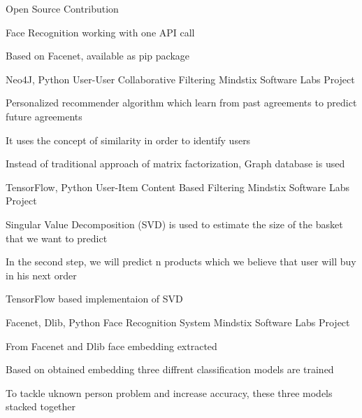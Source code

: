 \begin{cventries}
    {Open Source Contribution} %
    {} %
    {
      \begin{cvitems} %
        \item {Face Recognition working with one API call}
        \item {Based on Facenet, available as pip package}
      \end{cvitems}
    }
  \cventry
    {Neo4J, Python} %
    {User-User Collaborative Filtering} %
    {Mindstix Software Labs Project} %
    {} %
    {
      \begin{cvitems} %
        \item {Personalized recommender algorithm which learn from past agreements to predict future agreements}
        \item {It uses the concept of similarity in order to identify users}
        \item {Instead of traditional approach of matrix factorization, Graph database is used}
      \end{cvitems}
    }
  \cventry
    {TensorFlow, Python} %
    {User-Item Content Based Filtering} %
    {Mindstix Software Labs Project} %
    {} %
    {
      \begin{cvitems} %
        \item {Singular Value Decomposition (SVD) is used to estimate the size of the basket that we want to predict}
        \item {In the second step, we will predict n products which we believe that user will buy in his next order}
        \item {TensorFlow based implementaion of SVD}
      \end{cvitems}
    }
  \cventry
    {Facenet, Dlib, Python} %
    {Face Recognition System} %
    {Mindstix Software Labs Project} %
    {} %
    {
      \begin{cvitems} %
        \item {From Facenet and Dlib face embedding extracted}
        \item {Based on obtained embedding three diffrent classification models are trained }
        \item {To tackle uknown person problem and increase accuracy, these three models stacked together}
      \end{cvitems}
}
\end{cventries}
